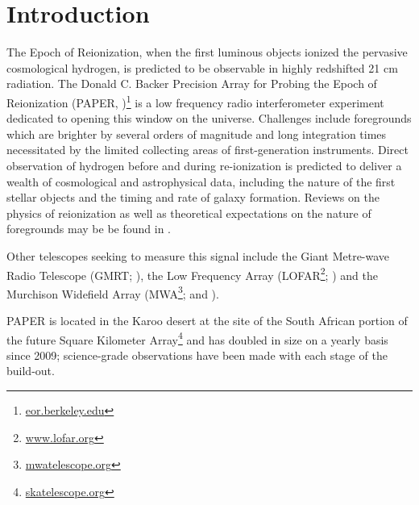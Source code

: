 \documentclass{aastex}
\begin{document}
\section{Introduction}
The Epoch of Reionization, when the first luminous objects ionized the pervasive cosmological hydrogen, is predicted to be observable in highly redshifted 21 cm radiation.  The Donald C. Backer Precision Array for Probing the Epoch of Reionization (PAPER, \cite{Parsons:2010p6757})\footnote{\url{eor.berkeley.edu}} is a low frequency radio interferometer experiment dedicated to opening this window on the universe.  Challenges include foregrounds which are brighter by several orders of magnitude and long integration times necessitated by the limited collecting areas of first-generation instruments. Direct observation of hydrogen before and during re-ionization is predicted to deliver a wealth of cosmological and astrophysical data, including the nature of the first stellar objects and the timing and rate of galaxy formation. Reviews on the physics of reionization as well as theoretical expectations on the nature of foregrounds may be be found in \citet{Furlanetto:2006p2267,Morales:2010p8093,Pritchard:2012p9555}.  

Other telescopes seeking to measure this signal include the Giant Metre-wave Radio Telescope (GMRT; \cite{Paciga:2013p9943}), the Low Frequency Array (LOFAR\footnote{\url{www.lofar.org}}; \cite{Yatawatta:2013p9699}) and the Murchison Widefield Array (MWA\footnote{\url{mwatelescope.org}}; \cite{Bowman:2013p9950} and \cite{Tingay:2013p9022}). 



PAPER is located in the Karoo desert at the site of the South African portion of the future Square Kilometer Array\footnote{\url{skatelescope.org}} and has doubled in size on a yearly basis since 2009; science-grade observations have been made with each stage of the build-out.  
\end{document}
